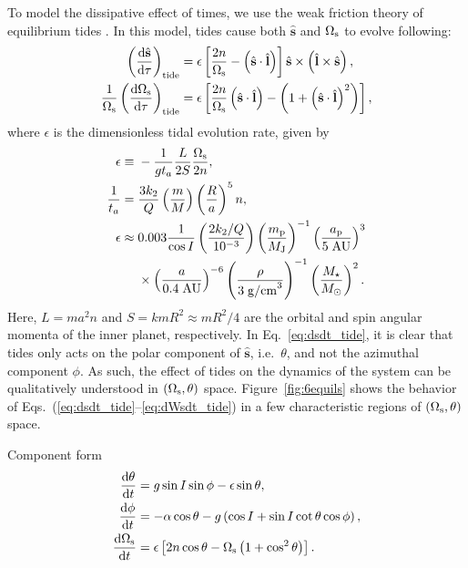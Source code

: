 \documentclass[
        fleqn,
        usenatbib,
    ]{mnras}
\newcommand*{\rd}[2]{\frac{\mathrm{d}#1}{\mathrm{d}#2}}
\newcommand*{\p}[1]{\left(#1\right)}
\newcommand*{\s}[1]{\left[#1\right]}
\newcommand*{\uv}[1]{\hat{\mathbf{#1}}}
\begin{document}
To model the dissipative effect of times, we use the weak friction theory of
equilibrium tides \citep{lai2012}. In this model, tides cause both $\uv{s}$ and
$\Omega_{\rm s}$ to evolve following:
\begin{align}
    \p{\rd{\uv{s}}{\tau}}_{\rm tide} &= \epsilon
                \s{\frac{2n}{\Omega_{\rm s}} - \p{\uv{s} \cdot \uv{l}}}
                    \uv{s} \times \p{\uv{l} \times \uv{s}}\label{eq:dsdt_tide},\\
    \frac{1}{\Omega_{\rm s}}\p{\rd{\Omega_{\rm s}}{\tau}}_{\rm tide}
        &= \epsilon \s{\frac{2n}{\Omega_{\rm s}}\p{\uv{s} \cdot
            \uv{l}} - \p{1 + \p{\uv{s} \cdot \uv{l}}^2}},\label{eq:dWsdt_tide}
\end{align}
where $\epsilon$ is the dimensionless tidal evolution rate, given by
\begin{align}
    \epsilon \equiv{}& -\frac{1}{gt_a}\frac{L}{2S} \frac{\Omega_{\rm s}}{2n},\\
    \frac{1}{t_a} ={}& \frac{3k_2}{Q}\p{\frac{m}{M}}\p{\frac{R}{a}}^5 n,\\
    \epsilon \approx{}& 0.003\frac{1}{\cos I}\p{\frac{2k_2/Q}{10^{-3}}}
            \p{\frac{m_{\rm p}}{M_{\rm J}}}^{-1}
            \p{\frac{a_{\rm p}}{5 \;\mathrm{AU}}}^{3}\nonumber\\
        &\times \p{\frac{a}{0.4\;\mathrm{AU}}}^{-6}
            \p{\frac{\rho}{3 \; \mathrm{g/cm}^3}}^{-1}
            \p{\frac{M_\star}{M_{\odot}}}^{2}.
\end{align}
Here, $L = ma^2n$ and $S = kmR^2 \approx mR^2/4$ are the orbital and spin
angular momenta of the inner planet, respectively. In Eq.~\eqref{eq:dsdt_tide},
it is clear that tides only acts on the polar component of $\uv{s}$,
i.e.\ $\theta$, and not the azimuthal component $\phi$. As such,
the effect of tides on the dynamics of the system can be qualitatively
understood in $(\Omega_{\rm s}, \theta)$ space. Figure~\ref{fig:6equils} shows
the behavior of Eqs.~(\ref{eq:dsdt_tide}--\ref{eq:dWsdt_tide}) in a few
characteristic regions of $(\Omega_{\rm s}, \theta)$ space.

Component form
\begin{align}
    \rd{\theta}{t} &= g\sin I \sin \phi -
        \epsilon \sin \theta,\label{eq:ds_fullq}\\
    \rd{\phi}{t} &= -\alpha\cos\theta
        - g\p{\cos I + \sin I \cot \theta \cos \phi}\label{eq:ds_fullphi},\\
    \rd{\Omega_{\rm s}}{t}
        &= \epsilon \s{2n \cos \theta
            - \Omega_{\rm s}\p{1 + \cos^2\theta}}\label{eq:ds_fulls}.
\end{align}
\end{document}
